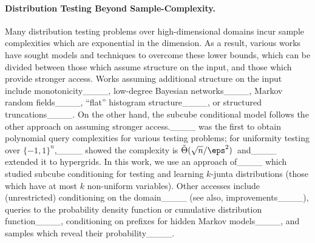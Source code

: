 \paragraph{Distribution Testing Beyond Sample-Complexity.} Many distribution testing problems over high-dimensional domains incur sample complexities which are exponential in the dimension. As a result, various works have sought models and techniques to overcome these lower bounds, which can be divided between those which assume structure on the input, and those which provide stronger access. Works assuming additional structure on the input include monotonicity____, low-degree Bayesian networks____, Markov random fields____, ``flat'' histogram structure____, or structured truncations____. On the other hand, the subcube conditional model follows the other approach on assuming stronger access.____ was the first to obtain polynomial query complexities for various testing problems; for uniformity testing over $\{-1,1\}^n$,____ showed the complexity is $\tilde{\Theta}(\sqrt{n}/\eps^2)$~and____ extended it to hypergrids. In this work, we use an approach of____ which studied subcube conditioning for testing and learning $k$-junta distributions (those which have at most $k$ non-uniform variables). Other accesses include (unrestricted) conditioning on the domain____ (see also, improvements____),  queries to the probability density function or cumulative distribution function____, conditioning on prefixes for hidden Markov models____, and samples which reveal their probability____.